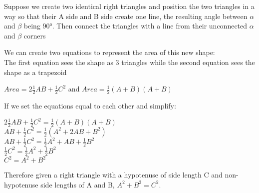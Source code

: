 \documentclass{article}
\begin{document}
Suppose we create two identical right triangles and position the two triangles in a way so that their 
A side and B side create one line, the resulting angle between {$\alpha$} and {$\beta$} being 90°. Then 
connect the triangles with a line from their unconnected {$\alpha$} and {$\beta$} corners\\
\begin{center}
\end{center}
We can create two equations to represent the area of this new shape:\\
The first equation sees the shape as 3 triangles while the second equation sees the shape as a trapezoid\\
\begin{center}
    $Area=2\frac{1}{2}AB+\frac{1}{2}C^2$ and $Area=\frac{1}{2}(A+B)(A+B)$
\end{center}
If we set the equations equal to each other and simplify:\\
\begin{center}
    $2\frac{1}{2}AB+\frac{1}{2}C^2=\frac{1}{2}(A+B)(A+B)$\\
    $AB+\frac{1}{2}C^2=\frac{1}{2}(A^2+2AB+B^2)$\\
    $AB+\frac{1}{2}C^2=\frac{1}{2}A^2+AB+\frac{1}{2}B^2$\\
    $\frac{1}{2}C^2=\frac{1}{2}A^2+\frac{1}{2}B^2$\\
    $C^2=A^2+B^2$\\
\end{center}
Therefore given a right triangle with a hypotenuse of side length C and non-hypotenuse side lengths of A and B, $A^2+B^2=C^2$.\\
\begin{flushright}
\end{flushright}
\end{document}
